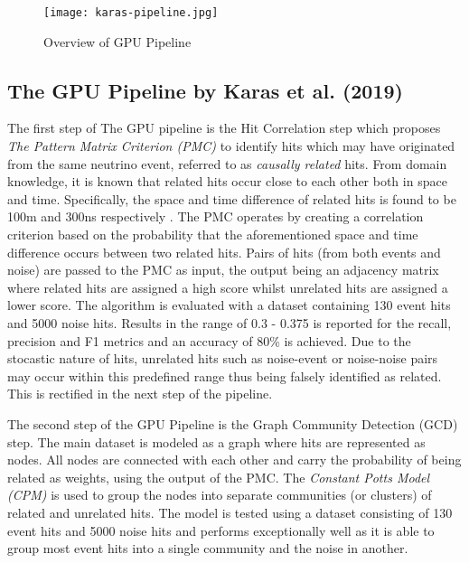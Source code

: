 \begin{figure}[htb]
  \centering
  \texttt{[image: karas-pipeline.jpg]}
  \caption{Overview of GPU Pipeline}
  \label{fig:karas-pipeline}
\end{figure}

\subsection{The GPU Pipeline by Karas et al. (2019)}
\label{sec:gpu-pipeline}

The first step of The GPU pipeline is the Hit
Correlation step which proposes \emph{The Pattern Matrix Criterion
(PMC)} to identify hits which may have originated from the same
neutrino event, referred to as \emph{causally related} hits. From
domain knowledge, it is known that related hits occur close to each
other both in space and time. Specifically, the space and time
difference of related hits is found to be 100m and 300ns respectively
\cite{adrian2016letter}. The PMC operates by creating a correlation
criterion based on the probability that the aforementioned space and
time difference occurs between two related hits. Pairs of hits (from
both events and noise) are passed to the PMC as input, the output
being an adjacency matrix where related hits are assigned a high score
whilst unrelated hits are assigned a lower score. The algorithm is
evaluated with a dataset containing 130 event hits and 5000 noise
hits. Results in the range of 0.3 - 0.375 is reported for the recall,
precision and F1 metrics and an accuracy of 80\% is achieved. Due to
the stocastic nature of hits, unrelated hits such as noise-event or
noise-noise pairs may occur within this predefined range thus being
falsely identified as related. This is rectified in the next step of
the pipeline.

The second step of the GPU Pipeline is the Graph Community Detection
(GCD) step. The main dataset is modeled as a graph where hits are
represented as nodes. All nodes are connected with each other and
carry the probability of being related as weights, using the output of
the PMC. The \emph{Constant Potts Model (CPM)} \cite{traag2011narrow}
is used to group the nodes into separate communities (or clusters) of
related and unrelated hits. The model is tested using a dataset
consisting of 130 event hits and 5000 noise hits and performs
exceptionally well as it is able to group most event hits into a
single community and the noise in another.

